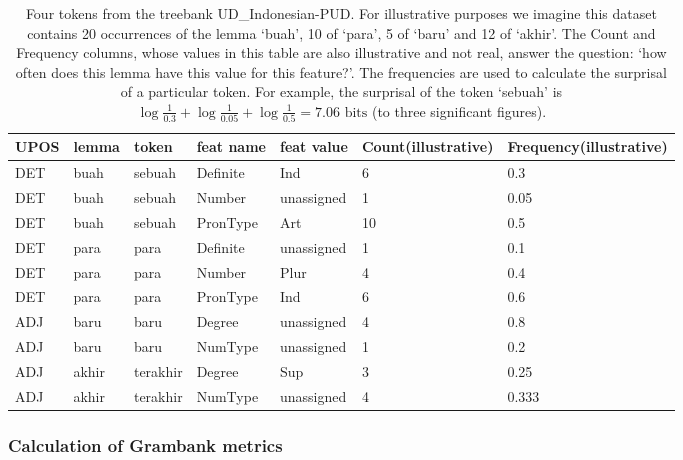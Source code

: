 \documentclass[USenglish]{article}
\begin{document}
\begin{table}[h]
    \centering
    \caption{Four tokens from the treebank UD\_Indonesian-PUD. For illustrative purposes we imagine this dataset contains 20 occurrences of the lemma `buah', 10 of `para', 5 of `baru' and 12 of `akhir'. The Count and Frequency columns, whose values in this table are also illustrative and not real, answer the question: `how often does this lemma have this value for this feature?'. The frequencies are used to calculate the surprisal of a particular token. For example, the surprisal of the token `sebuah' is $\log{\frac{1}{0.3}}+\log{\frac{1}{0.05}}+\log{\frac{1}{0.5}} = 7.06\text{ bits}$ (to three significant figures).} %
    \label{tab:unassigned_ex_SPLIT}   
    \begin{tabular}{p{0.7cm}p{1cm}p{1.4cm}p{1.3cm}p{1.5cm}p{1.4cm}p{1.6cm}}
\toprule

UPOS&lemma	&token	&feat name & feat value & Count\newline (illustrative) & Frequency\newline (illustrative)	\\ \midrule

DET & buah & sebuah & Definite& Ind & 6 & 0.3\\
DET & buah & sebuah & Number& unassigned & 1 & 0.05\\
DET & buah & sebuah & PronType& Art & 10 & 0.5
\\\midrule
DET & para	& para	&Definite & unassigned & 1 & 0.1\\
DET & para	& para	&Number & Plur & 4 & 0.4\\
DET & para	& para	&PronType & Ind & 6 & 0.6
\\\midrule
ADJ&baru	&baru& Degree&unassigned & 4 & 0.8\\
ADJ&baru	&baru& NumType&unassigned & 1 & 0.2 \\\midrule
ADJ & akhir	&terakhir&	Degree& Sup & 3 & 0.25\\
ADJ & akhir	&terakhir&	NumType & unassigned & 4 & 0.333\\
\bottomrule
\end{tabular}
\end{table}

\subsubsection{Calculation of Grambank metrics}\label{sec:appendix_rgrambank}
\end{document}

